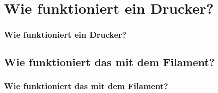 \section{Wie funktioniert ein Drucker?}
{
\begin{frame}
  \frametitle{Wie funktioniert ein Drucker?}
\end{frame}
}
{
\subsection{Wie funktioniert das mit dem Filament?}
\begin{frame}
  \frametitle{Wie funktioniert das mit dem Filament?}
\end{frame}
}


